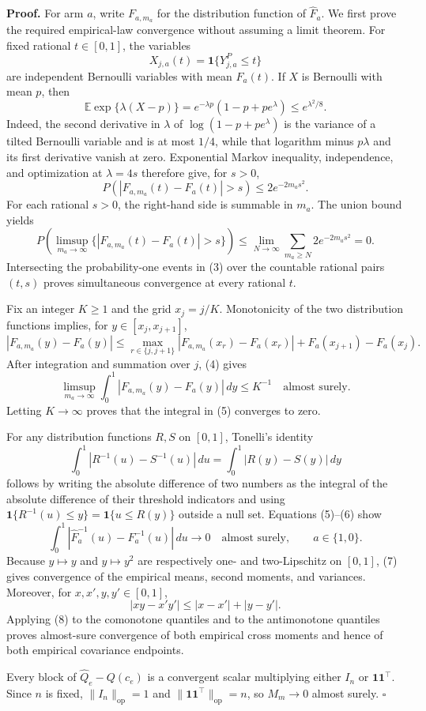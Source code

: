 \textbf{Proof.}
For arm \(a\), write \(F_{a,m_a}\) for the distribution function of \(\widehat F_a\).  We first prove the required empirical-law convergence without assuming a limit theorem.  For fixed rational \(t\in[0,1]\), the variables
\[
 X_{j,a}(t)=\mathbf 1\{Y^P_{j,a}\le t\}
\]
are independent Bernoulli variables with mean \(F_a(t)\).  If \(X\) is Bernoulli with mean \(p\), then
\[
 \mathbb E\exp\{\lambda(X-p)\}
 =e^{-\lambda p}(1-p+pe^\lambda)\le e^{\lambda^2/8}.
\tag{1}
\]
Indeed, the second derivative in \(\lambda\) of \(\log(1-p+pe^\lambda)\) is the variance of a tilted Bernoulli variable and is at most \(1/4\), while that logarithm minus \(p\lambda\) and its first derivative vanish at zero.  Exponential Markov inequality, independence, and optimization at \(\lambda=4s\) therefore give, for \(s>0\),
\[
 P\!\left(\left|F_{a,m_a}(t)-F_a(t)\right|>s\right)
 \le 2e^{-2m_as^2}.
\tag{2}
\]
For each rational \(s>0\), the right-hand side is summable in \(m_a\).  The union bound yields
\[
 P\!\left(\limsup_{m_a\to\infty}
 \{|F_{a,m_a}(t)-F_a(t)|>s\}\right)
 \le \lim_{N\to\infty}\sum_{m_a\ge N}2e^{-2m_as^2}=0.
\tag{3}
\]
Intersecting the probability-one events in (3) over the countable rational pairs \((t,s)\) proves simultaneous convergence at every rational \(t\).

Fix an integer \(K\ge1\) and the grid \(x_j=j/K\).  Monotonicity of the two distribution functions implies, for \(y\in[x_j,x_{j+1}]\),
\[
 |F_{a,m_a}(y)-F_a(y)|
 \le
 \max_{r\in\{j,j+1\}}|F_{a,m_a}(x_r)-F_a(x_r)|
 +F_a(x_{j+1})-F_a(x_j).
\tag{4}
\]
After integration and summation over \(j\), (4) gives
\[
 \limsup_{m_a\to\infty}
 \int_0^1|F_{a,m_a}(y)-F_a(y)|\,dy\le K^{-1}
\quad\text{almost surely}.
\tag{5}
\]
Letting \(K\to\infty\) proves that the integral in (5) converges to zero.

For any distribution functions \(R,S\) on \([0,1]\), Tonelli's identity
\[
 \int_0^1|R^{-1}(u)-S^{-1}(u)|\,du
 =\int_0^1|R(y)-S(y)|\,dy
\tag{6}
\]
follows by writing the absolute difference of two numbers as the integral of the absolute difference of their threshold indicators and using
\(
 \mathbf 1\{R^{-1}(u)\le y\}=\mathbf 1\{u\le R(y)\}
\)
outside a null set.  Equations (5)--(6) show
\[
 \int_0^1|\widehat F_a^{-1}(u)-F_a^{-1}(u)|\,du\longrightarrow0
 \quad\text{almost surely},\qquad a\in\{1,0\}.
\tag{7}
\]
Because \(y\mapsto y\) and \(y\mapsto y^2\) are respectively one- and two-Lipschitz on \([0,1]\), (7) gives convergence of the empirical means, second moments, and variances.  Moreover, for \(x,x',y,y'\in[0,1]\),
\[
 |xy-x'y'|\le |x-x'|+|y-y'|.
\tag{8}
\]
Applying (8) to the comonotone quantiles and to the antimonotone quantiles proves almost-sure convergence of both empirical cross moments and hence of both empirical covariance endpoints.

Every block of \(\widehat Q_e-Q(c_e)\) is a convergent scalar multiplying either \(I_n\) or \(\mathbf 1\mathbf 1^{\top}\).  Since \(n\) is fixed, \(\lVert I_n\rVert_{\mathrm{op}}=1\) and \(\lVert\mathbf 1\mathbf 1^{\top}\rVert_{\mathrm{op}}=n\), so \(M_m\to0\) almost surely. \(\square\)